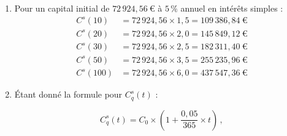 \documentclass{article}
\begin{document}
\begin{enumerate}[label=\textbf{R1.\arabic*}]
    \item Pour un capital initial de \( 72\,924,\!56\ \text{€} \) à \( 5\,\% \) annuel en intérêts simples :
          \begin{align*}
              C^s(10)  & = 72\,924,\!56 \times 1,\!5   = 109\,386,\!84\ \text{€} \\[0.4em]
              C^s(20)  & = 72\,924,\!56 \times 2,\!0   = 145\,849,\!12\ \text{€} \\[0.4em]
              C^s(30)  & = 72\,924,\!56 \times 2,\!5   = 182\,311,\!40\ \text{€} \\[0.4em]
              C^s(50)  & = 72\,924,\!56 \times 3,\!5   = 255\,235,\!96\ \text{€} \\[0.4em]
              C^s(100) & = 72\,924,\!56 \times 6,\!0   = 437\,547,\!36\ \text{€} 
          \end{align*}
          
    \item Étant donné la formule pour \( C_q^s(t) \) :
          
          \[
              C_q^s(t) = C_0 \times \left(1 + \frac{0{,}05}{365} \times t\right)\,,
          \]
          

\end{enumerate}
\end{document}
